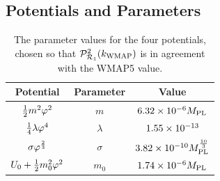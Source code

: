 \subsection{Potentials and Parameters}
\label{sec:pots-num}
\begin{table}[htb]
\begin{center}
\begin{tabular}{ccc}
\toprule
Potential & Parameter & Value\\
\midrule
$\frac{1}{2} m^2 \varphi^2$ & $m$ & $6.32\times 10^{-6}M_{\mathrm{PL}}$\\
$\frac{1}{4}\lambda\varphi^4$ & $\lambda$ & $1.55\times 10^{-13}$\\
$\sigma\varphi^{\frac{2}{3}}$ & $\sigma$ & $3.82\times 10^{-10}M_{\mathrm{PL}}^{\frac{10}{3}}$\\
$U_0 + \frac{1}{2} m_0^2 \varphi^2$ & $m_0$ & $1.74\times 10^{-6}M_{\mathrm{PL}}$\\
\bottomrule
\end{tabular}
\caption[Parameter Values for the Four Potentials]{The parameter values for the four
potentials, chosen so
that $\mathcal{P}^2_{\mathcal{R}_1}(k_\mathrm{WMAP})$ is in agreement with the WMAP5 value.}
\label{tab:params-num}
\end{center}
% 
\end{table}

